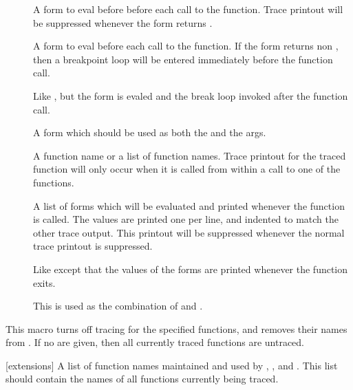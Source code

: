 \begin{description}

\item[]
A form to eval before before each call to the
function.  Trace printout will be suppressed whenever the form
returns \false{}.

\item[]
A form to eval before each call to the function.  If the
form returns non \false{}, then a breakpoint loop will be entered
immediately before the function call.

\item[]
Like , but the form is evaled and the break loop
invoked after the function call.

\item[]
A form which should be used as both the  and the
 args.

\item[]
A function name or a list of function names.  Trace
printout for the traced function will only occur when it is called from
within a call to one of the  functions.

\item[]
A list of forms which will be evaluated and printed
whenever the function is called.  The values are printed one per line,
and indented to match the other trace output.  This printout will be
suppressed whenever the normal trace printout is suppressed.

\item[]
Like  except that the values of the
forms are printed whenever the function exits.

\item[]
This is used as the combination of  and .
\end{description}
\enddefmac

This macro turns off tracing for the specified functions, and removes their
names from .  If no  are given,
then all currently traced functions are untraced.
\enddefmac

[extensions]
A list of function names maintained and used by ,
, and .  This list should contain the names
of all functions currently being traced.
\enddefvar

